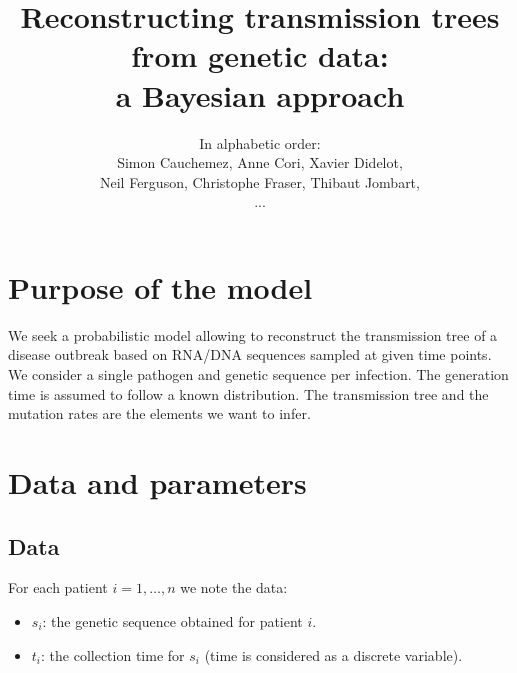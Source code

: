 \documentclass[10pt]{article}
\author{In alphabetic order: \\Simon Cauchemez, Anne Cori, Xavier Didelot, \\Neil Ferguson, Christophe Fraser, Thibaut Jombart,\\...}
\title{Reconstructing transmission trees from genetic data: \\a Bayesian approach}
\begin{document}
\maketitle

\section*{Purpose of the model}
We seek a probabilistic model allowing to reconstruct the transmission tree of a disease outbreak based on RNA/DNA sequences sampled at given time points.
We consider a single pathogen and genetic sequence per infection.
The generation time is assumed to follow a known distribution.
The transmission tree and the mutation rates are the elements we want to infer.



\section*{Data and parameters}

\subsection*{Data}
For each patient $i=1,\ldots,n$ we note the data:
\begin{itemize}
	\item $s_i$: the genetic sequence obtained for patient $i$.
	\item $t_i$: the collection time for $s_i$ (time is considered as a discrete variable).
\end{itemize}
\end{document}
